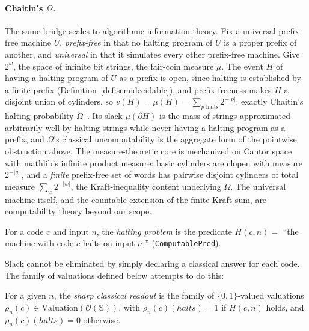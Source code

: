 \paragraph{Chaitin's $\Omega$.}
The same bridge scales to algorithmic information theory.  Fix a
universal prefix-free machine $U$, \emph{prefix-free} in that no
halting program of $U$ is a proper prefix of another, and
\emph{universal} in that it simulates every other prefix-free
machine.  Give $2^{\omega}$, the space of infinite bit strings, the
fair-coin measure $\mu$.  The event $H$
of having a halting program of $U$ as a prefix is open, since
halting is established by a finite prefix
(Definition~\ref{def:semidecidable}), and prefix-freeness makes $H$
a disjoint union of cylinders, so
$v(H) = \mu(H) = \sum_{p \text{ halts}} 2^{-|p|}$: exactly Chaitin's
halting probability $\Omega$~\cite{chaitin1975}.  Its slack
$\mu(\partial H)$ is the mass of strings approximated arbitrarily
well by halting strings while never having a halting program as a
prefix, and $\Omega$'s classical uncomputability is the aggregate
form of the pointwise obstruction above.  The measure-theoretic core
is mechanized on Cantor space with \textsf{mathlib}'s infinite
product measure: basic cylinders are clopen with measure
$2^{-|w|}$, and a \emph{finite}
prefix-free set of words has pairwise disjoint cylinders of total
measure $\sum_w 2^{-|w|}$,
the Kraft-inequality content underlying $\Omega$.  The universal
machine itself, and the countable extension of the finite Kraft sum,
are computability theory beyond our scope.

\begin{definition}
For a code $c$ and input $n$, the \emph{halting problem} is the
predicate $H(c, n) = $ ``the machine with code $c$ halts on input
$n$,'' (\texttt{ComputablePred}). 
\end{definition}

\noindent
Slack cannot be eliminated by simply declaring a classical answer
for each code. The family of valuations
defined below attempts to do this:

\begin{definition}
For a given $n$, the \emph{sharp classical readout} is the family
of $\{0,1\}$-valued valuations $\rho_n(c) \in \mathrm{Valuation}(\mathcal{O}(\mathbb{S}))$,
with $\rho_n(c)(\mathit{halts}) = 1$ if $H(c,n)$
holds, and $\rho_n(c)(\mathit{halts}) = 0$ otherwise.
\end{definition}

